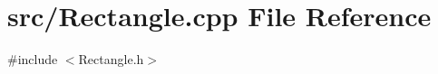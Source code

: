 \section{src/\+Rectangle.cpp File Reference}
\label{_rectangle_8cpp}
{\ttfamily \#include $<$Rectangle.\+h$>$}\newline
